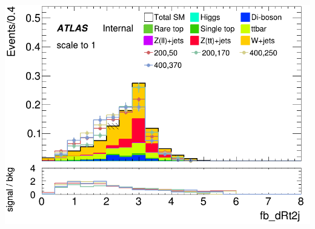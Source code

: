 \documentclass[usenames,dvipsnames]{beamer}
\begin{document}
\begin{frame}
\begin{minipage}{0.32\textwidth}
        \centering
        \includegraphics[width=\textwidth]{graphics/LH_met_sig/LH_fb_dRt2j_norm.png}
    \end{minipage}
    
    \vspace{0.5cm} %


\end{frame}
\end{document}
